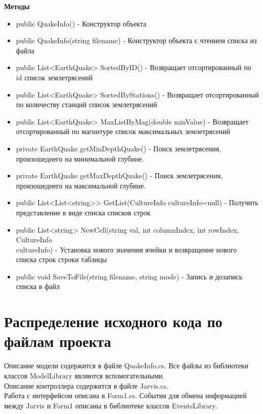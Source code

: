 \documentclass[a4paper,12pt, fleqn]{article}
\theoremstyle{plain} %
\theoremstyle{definition} %
\theoremstyle{remark} %
\numberwithin{equation}{section}
\begin{document}
\textbf{Методы}
\begin{itemize}
	\item public QuakeInfo() - Конструктор объекта
	\item public QuakeInfo(string filename) - Конструктор объекта с чтением списка из файла
	\item public List<EarthQuake> SortedByID() - Возвращает отсортированный по id список землетрясений
	\item public List<EarthQuake> SortedByStations() - Возвращает отсортированный по количеству станций список землетрясений
	\item public List<EarthQuake> MaxListByMag(double minValue) - Возвращает отсортированный по магнитуре список максимальных землетрясений
	\item private EarthQuake getMinDepthQuake() - Поиск землетрясения, произошеднего на минимальной глубине.
	\item private EarthQuake getMaxDepthQuake() - Поиск землетрясения, произошеднего на максимальной глубине.
	\item public List<List<string>> GetList(CultureInfo cultureInfo=null) - Получить представление в виде списка списков строк
	\item public List<string> NewCell(string val, int columnIndex, int rowIndex, CultureInfo\\ cultureInfo) - Установка нового значения ячейки и возвращение нового списка строк строки таблицы
	\item public void SaveToFile(string filename, string mode) - Запись и дозапись списка в файл 
\end{itemize}

\section{Распределение исходного кода по файлам проекта}
Описание модели содержится в файле QuakeInfo.cs. Все файлы из библиотеки классов ModelLibrary являются вспомогательными.\\
Описание контроллера содержится в файле Jarvis.cs.\\
Работа с интерфейсом описана в Form1.cs.
События для обмена информацией между Jarvis и Form1 описаны в библиотеке классов EventsLibrary.
\end{document}
